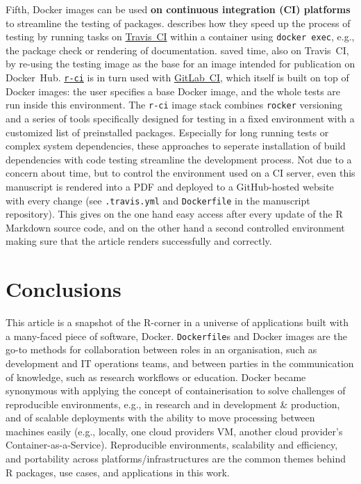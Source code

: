 \label{ci} Fifth, Docker images can be used \textbf{on continuous
integration (CI) platforms} to streamline the testing of packages.
\citet{ye_docker_2019} describes how they speed up the process of
testing by running tasks on \href{https://travis-ci.org/}{Travis~CI}
within a container using \texttt{docker\ exec}, e.g., the package check
or rendering of documentation. \citet{cardozo_faster_2018} saved time,
also on Travis~CI, by re-using the testing image as the base for an
image intended for publication on Docker~Hub.
\href{https://github.com/ColinFay/r-ci}{\texttt{r-ci}} is in turn used
with \href{https://docs.gitlab.com/ee/ci/}{GitLab~CI}, which itself is
built on top of Docker images: the user specifies a base Docker image,
and the whole tests are run inside this environment. The \texttt{r-ci}
image stack combines \texttt{rocker} versioning and a series of tools
specifically designed for testing in a fixed environment with a
customized list of preinstalled packages. Especially for long running
tests or complex system dependencies, these approaches to seperate
installation of build dependencies with code testing streamline the
development process. Not due to a concern about time, but to control the
environment used on a CI server, even this manuscript is rendered into a
PDF and deployed to a GitHub-hosted website with every change (see
\texttt{.travis.yml} and \texttt{Dockerfile} in the manuscript
repository). This gives on the one hand easy access after every update
of the R Markdown source code, and on the other hand a second controlled
environment making sure that the article renders successfully and
correctly.

\hypertarget{conclusions}{%
\section{Conclusions}\label{conclusions}}

\label{conclusions}

This article is a snapshot of the R-corner in a universe of applications
built with a many-faced piece of software, Docker. \texttt{Dockerfile}s
and Docker images are the go-to methods for collaboration between roles
in an organisation, such as development and IT operations teams, and
between parties in the communication of knowledge, such as research
workflows or education. Docker became synonymous with applying the
concept of containerisation to solve challenges of reproducible
environments, e.g., in research and in development \& production, and of
scalable deployments with the ability to move processing between
machines easily (e.g., locally, one cloud providers VM, another cloud
provider's Container-as-a-Service). Reproducible environments,
scalability and efficiency, and portability across
platforms/infrastructures are the common themes behind R packages, use
cases, and applications in this work.

